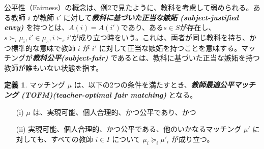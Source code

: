 \documentclass[12pt, a4paper]{article}
\theoremstyle{definition}
\newtheorem{defn}{定義}
\theoremstyle{remark}
\theoremstyle{plain}
\begin{document}




公平性（Fairness）の概念は、例2で見たように、教科を考慮して弱められる。ある教師 $i$ が教師 $i'$ に対して\textbf{\textit{教科に基づいた正当な嫉妬 (subject-justified envy) }}を持つとは、$A(i) = A(i')$であり、ある$ s \in S$が存在し、$s \succ_i \mu_i, i' \in \mu_s, i \succ_s i'$が成り立つ時をいう。これは、両者が同じ教科を持ち、かつ標準的な意味で教師 $i$ が $i'$ に対して正当な嫉妬を持つことを意味する。マッチングが\textbf{\textit{教科公平(subject-fair) }} であるとは、教科に基づいた正当な嫉妬を持つ教師が誰もいない状態を指す。


  
  



\begin{defn}
マッチング $\mu$ は、以下の2つの条件を満たすとき、\textbf{\textit{教師最適公平マッチング (TOFM)(teacher-optimal fair matching) }} となる。
\begin{itemize}
    \item[(i)] $\mu$ は、実現可能、個人合理的、かつ公平であり、かつ
    \item[(ii)] 実現可能、個人合理的、かつ公平である、他のいかなるマッチング $\mu'$ に対しても、すべての教師 $i \in I$ について $\mu_i \succeq_i \mu'_i$ が成り立つ。
\end{itemize}
\end{defn}
\end{document}
